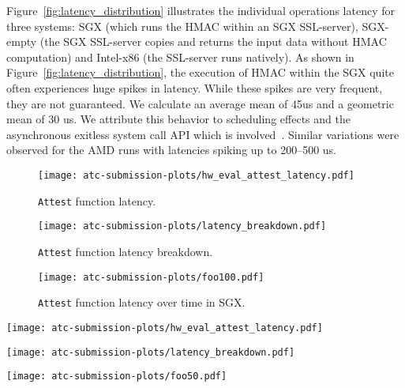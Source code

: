 Figure~\ref{fig:latency_distribution} illustrates the individual operations latency for three systems: SGX (which runs the HMAC within an SGX SSL-server), SGX-empty (the SGX SSL-server copies and returns the input data without HMAC computation) and Intel-x86 (the SSL-server runs natively).  As shown in Figure~\ref{fig:latency_distribution}, the execution of HMAC within the SGX quite often experiences huge spikes in latency. While these spikes are very frequent, they are not guaranteed. We calculate an average mean of 45us and a geometric mean of 30 us. We attribute this behavior to scheduling effects and the asynchronous exitless system call API which is involved~\cite{scone}. Similar variations were observed for the AMD runs with latencies spiking up to 200--500 us.

\begin{figure}
    \centering
    \texttt{[image: atc-submission-plots/hw\_eval\_attest\_latency.pdf]} 
  \caption{{\tt Attest} function latency.}
  \label{fig:attest_kernel}
\end{figure}

\begin{figure}
    \centering
  \texttt{[image: atc-submission-plots/latency\_breakdown.pdf]}
  \caption{{\tt Attest} function latency breakdown.}\label{fig:latency_breakdown}
\end{figure}

\begin{figure}
    \centering
  \texttt{[image: atc-submission-plots/foo100.pdf]}
  \caption{{\tt Attest} function latency over time in SGX.}\label{fig:latency_distribution}\label{fig:latency_breakdown}
\end{figure}

\begin{figure*}[t!]
\begin{center}
  \centering
  \texttt{[image: atc-submission-plots/hw\_eval\_attest\_latency.pdf]} 
  \caption{HMAC (Attest) latency}
  \label{fig:attest_kernel}
\endminipage
{}
  \centering
  \texttt{[image: atc-submission-plots/latency\_breakdown.pdf]}
  \caption{Latency breakdown}\label{fig:latency_breakdown}
\endminipage

%
  \centering
  \texttt{[image: atc-submission-plots/foo50.pdf]}
  \caption{Latency distribution over time}\label{fig:latency_distribution}
\endminipage
\end{center}
\end{figure*}
\fi

